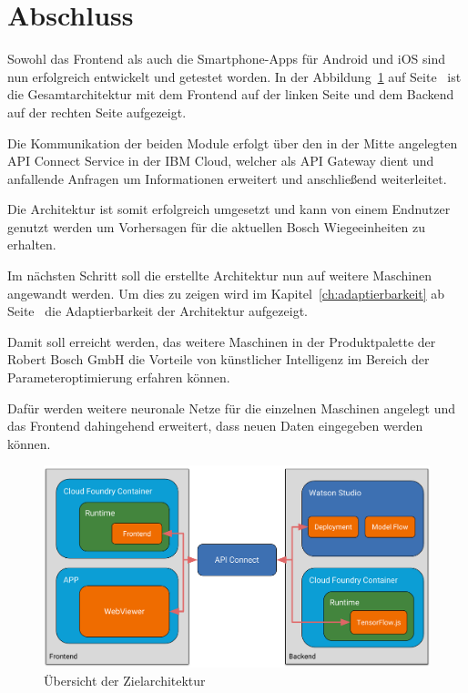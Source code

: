 \section{Abschluss}
Sowohl das Frontend als auch die Smartphone-Apps für Android und iOS sind nun erfolgreich entwickelt und getestet worden.
In der Abbildung~\ref{fig:umsetzung_zielarchitektur_4} auf Seite~\pageref{fig:umsetzung_zielarchitektur_4} ist die
Gesamtarchitektur mit dem Frontend auf der linken Seite und dem Backend auf der rechten Seite aufgezeigt.

Die Kommunikation der beiden Module erfolgt über den in der Mitte angelegten API Connect Service in der IBM Cloud,
welcher als API Gateway dient und anfallende Anfragen um Informationen erweitert und anschließend weiterleitet.

Die Architektur ist somit erfolgreich umgesetzt und kann von einem Endnutzer genutzt werden um Vorhersagen für die
aktuellen Bosch Wiegeeinheiten zu erhalten.

Im nächsten Schritt soll die erstellte Architektur nun auf weitere Maschinen angewandt werden. Um dies zu zeigen wird
im Kapitel~\ref{ch:adaptierbarkeit} ab Seite~\pageref{ch:adaptierbarkeit} die Adaptierbarkeit der Architektur aufgezeigt.

Damit soll erreicht werden, das weitere Maschinen in der Produktpalette der Robert Bosch GmbH die Vorteile von
künstlicher Intelligenz im Bereich der Parameteroptimierung erfahren können.

Dafür werden weitere neuronale Netze für die einzelnen Maschinen angelegt und das Frontend dahingehend erweitert,
dass neuen Daten eingegeben werden können.

\begin{figure}[h]
    \centering
    \includegraphics[width=\textwidth]{images/kapitel_4/architektur_uebersicht.pdf}
    \caption{Übersicht der Zielarchitektur}
    \label{fig:umsetzung_zielarchitektur_4}
\end{figure}